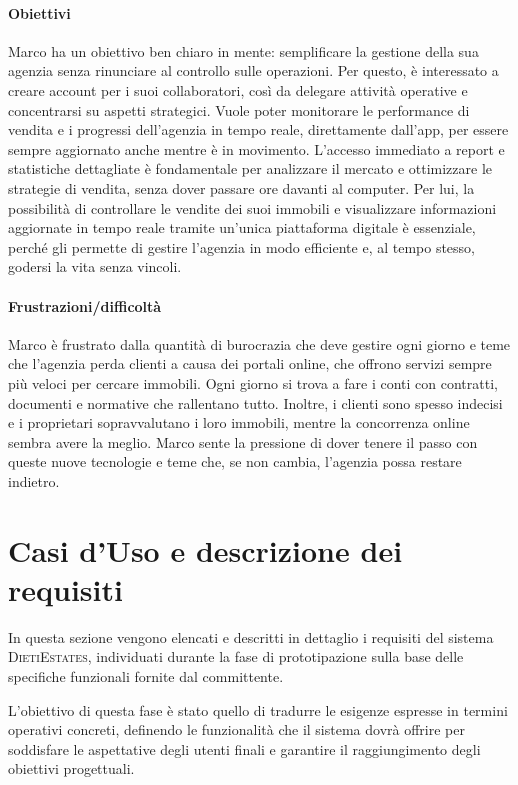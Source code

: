 \paragraph{Obiettivi}
Marco ha un obiettivo ben chiaro in mente: semplificare la gestione della sua agenzia senza rinunciare al controllo sulle operazioni. Per questo, è interessato a creare account per i suoi collaboratori, così da delegare attività operative e concentrarsi su aspetti strategici. Vuole poter monitorare le performance di vendita e i progressi dell’agenzia in tempo reale, direttamente dall’app, per essere sempre aggiornato anche mentre è in movimento. L’accesso immediato a report e statistiche dettagliate è fondamentale per analizzare il mercato e ottimizzare le strategie di vendita, senza dover passare ore davanti al computer. Per lui, la possibilità di controllare le vendite dei suoi immobili e visualizzare informazioni aggiornate in tempo reale tramite un’unica piattaforma digitale è essenziale, perché gli permette di gestire l’agenzia in modo efficiente e, al tempo stesso, godersi la vita senza vincoli.

\paragraph{Frustrazioni/difficoltà}
Marco è frustrato dalla quantità di burocrazia che deve gestire ogni giorno e teme che l’agenzia perda clienti a causa dei portali online, che offrono servizi sempre più veloci per cercare immobili. Ogni giorno si trova a fare i conti con contratti, documenti e normative che rallentano tutto. Inoltre, i clienti sono spesso indecisi e i proprietari sopravvalutano i loro immobili, mentre la concorrenza online sembra avere la meglio. Marco sente la pressione di dover tenere il passo con queste nuove tecnologie e teme che, se non cambia, l’agenzia possa restare indietro.

\section{Casi d'Uso e descrizione dei requisiti}

In questa sezione vengono elencati e descritti in dettaglio i requisiti del sistema \textsc{DietiEstates}, individuati durante la fase di prototipazione sulla base delle specifiche funzionali fornite dal committente.

L’obiettivo di questa fase è stato quello di tradurre le esigenze espresse in termini operativi concreti, definendo le funzionalità che il sistema dovrà offrire per soddisfare le aspettative degli utenti finali e garantire il raggiungimento degli obiettivi progettuali.

